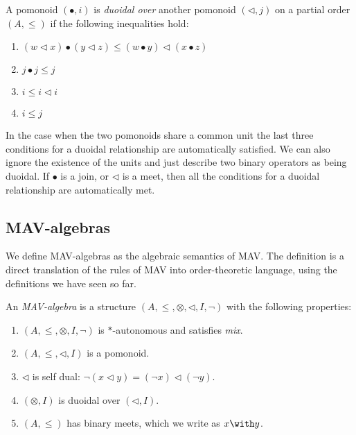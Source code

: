 \begin{definition}\label{defn:duoidal}
  A pomonoid $(\bullet, i)$ is \emph{duoidal over} another pomonoid
  $(\lhd, j)$ on a partial order $(A, \leq)$ if the following
  inequalities hold:
  \begin{enumerate}
    \item $(w \lhd x) \bullet (y \lhd z) \leq (w \bullet y) \lhd (x \bullet z)$
    \item $j \bullet j \leq j$
    \item $i \leq i \lhd i$
    \item $i \leq j$
  \end{enumerate}
\end{definition}

\begin{remark}
  In the case when the two pomonoids share a common unit the last
  three conditions for a duoidal relationship are automatically
  satisfied. We can also ignore the existence of the units and just
  describe two binary operators as being duoidal. If $\bullet$ is a
  join, or $\lhd$ is a meet, then all the conditions for a duoidal
  relationship are automatically met.
\end{remark}

\subsection{MAV-algebras}

We define MAV-algebras as the algebraic semantics of MAV. The
definition is a direct translation of the rules of MAV into
order-theoretic language, using the definitions we have seen so far.

\begin{definition}\label{defn:mav-algebra}
  An \emph{MAV-algebra} is a structure
  $(A, \leq, \otimes, \lhd, I, \lnot)$ with the following properties:
  \begin{enumerate}
  \item $(A, \leq, \otimes, I, \lnot)$ is $*$-autonomous and satisfies \emph{mix}.
  \item $(A, \leq, \lhd, I)$ is a pomonoid.
  \item $\lhd$ is self dual: $\lnot (x \lhd y) = (\lnot x)\lhd (\lnot y)$.
  \item $(\otimes, I)$ is duoidal over $(\lhd, I)$.
  \item $(A, \leq)$ has binary meets, which we write as $x \with y$.
  \end{enumerate}
\end{definition}

